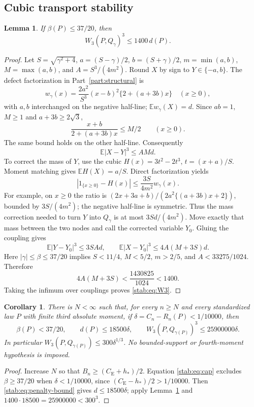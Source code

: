 \documentclass[11pt,a4paper]{article}
\numberwithin{equation}{section}
\newtheorem{lemma}[theorem]{Lemma}
\newtheorem{corollary}[theorem]{Corollary}
\theoremstyle{definition}
\theoremstyle{remark}
\newcommand{\E}{\mathbb E}
\newcommand{\CE}{C_{\mathrm E}}
\begin{document}
\subsection{Cubic transport stability}

\begin{lemma}\label{stab:lem:transport}
If $\beta(P)\le37/20$, then
\begin{equation}\label{stab:eq:W3}
                         W_3(P,Q_\gamma)^3\le1400\,d(P).
\end{equation}
\end{lemma}
\begin{proof}
Let $S=\sqrt{\gamma^2+4}$, $a=(S-\gamma)/2$,
$b=(S+\gamma)/2$, $m=\min(a,b)$, $M=\max(a,b)$, and
$A=S^3/(4m^2)$. Round $X$ by sign to $Y\in\{-a,b\}$.
The defect factorization in Part~\ref{part:structural} is
\[
 w_\gamma(x)=\frac{2a^2}{S^3}(x-b)^2\{2+(a+3b)x\}\quad(x\ge0),
\]
with $a,b$ interchanged on the negative half-line; $\E w_\gamma(X)=d$.
Since $ab=1$, $M\ge1$ and $a+3b\ge2\sqrt3$,
\[
 \frac{x+b}{2+(a+3b)x}\le M/2\qquad(x\ge0).
\]
The same bound holds on the other half-line. Consequently
\[
                            \E|X-Y|^3\le A M d.
\]
To correct the mass of $Y$, use the cubic $H(x)=3t^2-2t^3$,
$t=(x+a)/S$. Moment matching gives $\E H(X)=a/S$.
Direct factorization yields
\[
 |1_{\{x\ge0\}}-H(x)|
 \le\frac{3S}{4m^2}w_\gamma(x).
\]
For example, on $x\ge0$ the ratio is
$(2x+3a+b)/(2a^2\{(a+3b)x+2\})$, bounded by $3S/(4m^2)$;
the negative half-line is symmetric.
Thus the mass correction needed to turn $Y$ into $Q_\gamma$ is
at most $3S d/(4m^2)$. Move exactly that mass between the two nodes
and call the corrected variable $Y_0$. Gluing the coupling gives
\[
 \E|Y-Y_0|^3\le3S A d,\qquad
 \E|X-Y_0|^3\le4A(M+3S)d.
\]
Here $|\gamma|\le\beta\le37/20$ implies
$S<11/4$, $M<5/2$, $m>2/5$, and
$A<33275/1024$. Therefore
\[
             4A(M+3S)<\frac{1430825}{1024}<1400.
\]
Taking the infimum over couplings proves \eqref{stab:eq:W3}.
\end{proof}

\begin{corollary}\label{stab:cor:stability}
There is $N<\infty$ such that, for every $n\ge N$ and every standardized
law $P$ with finite third absolute moment, if
$\delta=C_n-R_n(P)<1/10000$, then
\[
 \beta(P)<37/20,\qquad
 d(P)\le18500\delta,\qquad
 W_3(P,Q_{\gamma(P)})^3\le25900000\delta.
\]
In particular $W_3(P,Q_{\gamma(P)})\le300\delta^{1/3}$.
No bounded-support or fourth-moment hypothesis is imposed.
\end{corollary}
\begin{proof}
Increase $N$ so that
$B_n\ge(\CE+h_*)/2$. Equation \eqref{stab:eq:cap} excludes
$\beta\ge37/20$ when $\delta<1/10000$, since
$(\CE-h_*)/2>1/10000$.
Then \eqref{stab:eq:penalty-bound} gives
$d\le18500\delta$; apply Lemma~\ref{stab:lem:transport} and
$1400\cdot18500=25900000<300^3$.
\end{proof}
\end{document}
